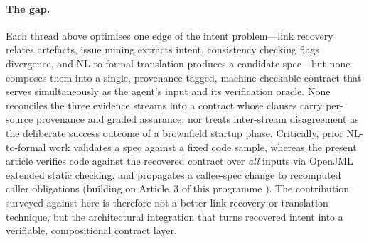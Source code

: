 \paragraph{The gap.}
Each thread above optimises one edge of the intent problem---link recovery relates artefacts, issue mining extracts intent, consistency checking flags divergence, and NL-to-formal translation produces a candidate spec---but none composes them into a single, provenance-tagged, machine-checkable contract that serves simultaneously as the agent's input and its verification oracle. None reconciles the three evidence streams into a contract whose clauses carry per-source provenance and graded assurance, nor treats inter-stream disagreement as the deliberate success outcome of a brownfield startup phase. Critically, prior NL-to-formal work validates a spec against a fixed code sample, whereas the present article verifies code against the recovered contract over \emph{all} inputs via OpenJML extended static checking, and propagates a callee-spec change to recomputed caller obligations (building on Article~3 of this programme \cite{edmonds_article3}). The contribution surveyed against here is therefore not a better link recovery or translation technique, but the architectural integration that turns recovered intent into a verifiable, compositional contract layer.
